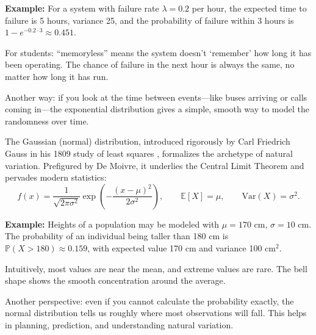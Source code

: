 \documentclass{book}
\begin{document}
\textbf{Example:} For a system with failure rate $\lambda=0.2$ per hour, the expected time to failure is 5 hours, variance 25, and the probability of failure within 3 hours is $1-e^{-0.2\cdot3} \approx 0.451$.

For students: “memoryless” means the system doesn’t ‘remember’ how long it has been operating. The chance of failure in the next hour is always the same, no matter how long it has run.

Another way: if you look at the time between events—like buses arriving or calls coming in—the exponential distribution gives a simple, smooth way to model the randomness over time.

The Gaussian (normal) distribution, introduced rigorously by Carl Friedrich Gauss in his 1809 study of least squares \cite{gauss-astronomy}, formalizes the archetype of natural variation. Prefigured by De Moivre, it underlies the Central Limit Theorem and pervades modern statistics:
\[
f(x) = \frac{1}{\sqrt{2\pi\sigma^2}} \exp\!\left( -\frac{(x-\mu)^2}{2\sigma^2} \right), \qquad
\mathbb{E}[X]=\mu, \qquad
\mathrm{Var}(X)=\sigma^2.
\]

\textbf{Example:} Heights of a population may be modeled with $\mu=170$ cm, $\sigma=10$ cm. The probability of an individual being taller than 180 cm is $\mathbb{P}(X>180) \approx 0.159$, with expected value 170 cm and variance 100 cm\(^2\).

Intuitively, most values are near the mean, and extreme values are rare. The bell shape shows the smooth concentration around the average.

Another perspective: even if you cannot calculate the probability exactly, the normal distribution tells us roughly where most observations will fall. This helps in planning, prediction, and understanding natural variation.
\end{document}
